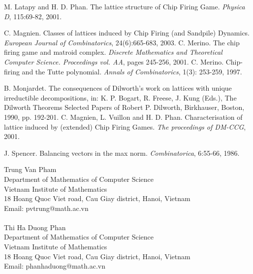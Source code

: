 \documentclass{article}
\theoremstyle{definition}
\begin{document}
\begin{thebibliography}{9}
 M. Latapy and H. D.  Phan. The lattice structure of Chip Firing Game. \emph{Physica D}, 115:69-82, 2001.

 C. Magnien. Classes of lattices induced by Chip Firing (and Sandpile) Dynamics. \emph{European Journal of Combinatorics}, 24(6):665-683, 2003.
 C. Merino. The chip firing game and matroid complex. \emph{Discrete Mathematics and Theoretical Computer Science. Proceedings vol. AA}, pages 245-256, 2001.
 C. Merino. Chip-firing and the Tutte polynomial. \emph{Annals of Combinatorics}, 1(3): 253-259, 1997.

 B. Monjardet. The consequences of Dilworth's work on lattices with unique irreductible decompositions, in: K. P. Bogart, R. Freese, J. Kung (Eds.), The Dilworth Theorems Selected Papers of Robert P. Dilworth, Birkhauser, Boston, 1990, pp. 192-201.
 C. Magnien, L. Vuillon and H. D. Phan. Characterisation of lattice induced by (extended) Chip Firing Games. \emph{The proceedings of DM-CCG}, 2001.

 J. Spencer. Balancing vectors in the max norm. \emph{Combinatorica}, 6:55-66, 1986.
\end{thebibliography}
Trung Van Pham\\
Department of Mathematics of Computer Science\\
Vietnam Institute of Mathematics\\
18 Hoang Quoc Viet road, Cau Giay district, Hanoi, Vietnam\\
Email: pvtrung@math.ac.vn\\
\text{}\\
Thi Ha Duong Phan\\
Department of Mathematics of Computer Science\\
Vietnam Institute of Mathematics\\
18 Hoang Quoc Viet road, Cau Giay district, Hanoi, Vietnam\\
Email: phanhaduong@math.ac.vn
\end{document}
